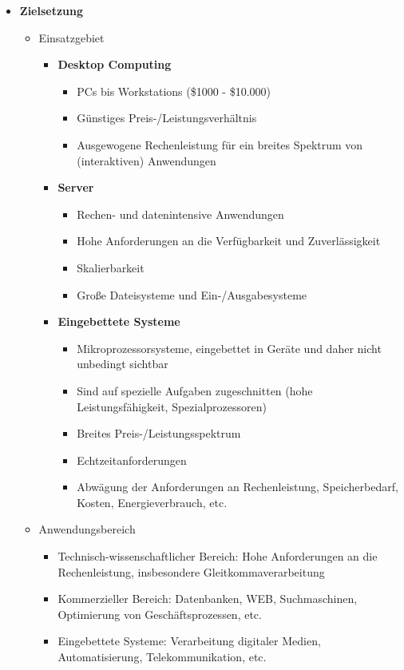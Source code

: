 \begin{itemize}
	\item \textbf{Zielsetzung}
	\begin{itemize}
		\item Einsatzgebiet
		\begin{itemize}
			\item \textbf{Desktop Computing}
			\begin{itemize}
				\item PCs bis Workstations (\$1000 - \$10.000)
				\item Günstiges Preis-/Leistungsverhältnis
				\item Ausgewogene Rechenleistung für ein breites Spektrum von (interaktiven) Anwendungen
			\end{itemize}
			\item \textbf{Server}
			\begin{itemize}
				\item Rechen- und datenintensive Anwendungen
				\item Hohe Anforderungen an die Verfügbarkeit und Zuverlässigkeit
				\item Skalierbarkeit
				\item Große Dateisysteme und Ein-/Ausgabesysteme
			\end{itemize}
			\item \textbf{Eingebettete Systeme}
			\begin{itemize}
				\item Mikroprozessorsysteme, eingebettet in Geräte und daher nicht unbedingt sichtbar
				\item Sind auf spezielle Aufgaben zugeschnitten (hohe Leistungsfähigkeit, Spezialprozessoren)
				\item Breites Preis-/Leistungsspektrum
				\item Echtzeitanforderungen
				\item Abwägung der Anforderungen an Rechenleistung, Speicherbedarf, Kosten, Energieverbrauch, etc.
			\end{itemize}
		\end{itemize}
		\item Anwendungsbereich
		\begin{itemize}
			\item Technisch-wissenschaftlicher Bereich: Hohe Anforderungen an die Rechenleistung, insbesondere Gleitkommaverarbeitung
			\item Kommerzieller Bereich: Datenbanken, WEB, Suchmaschinen, Optimierung von Geschäftsprozessen, etc.
			\item Eingebettete Systeme: Verarbeitung digitaler Medien, Automatisierung, Telekommunikation, etc.

\end{itemize}
\end{itemize}
\end{itemize}
